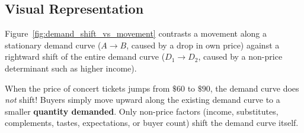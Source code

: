 \documentclass[11pt,letterpaper]{article}
\begin{document}
\subsection*{Visual Representation}
Figure~\ref{fig:demand_shift_vs_movement} contrasts a movement along a stationary demand curve ($A \to B$, caused by a drop in own price) against a rightward shift of the entire demand curve ($D_1 \to D_2$, caused by a non-price determinant such as higher income).

\begin{tcolorbox}[colback=CourseAmber!12!white,colframe=CourseOrange,title=\textbf{Clear It Up: Never Say ``Price Rose, So Demand Fell''}]
When the price of concert tickets jumps from $\$60$ to $\$90$, the demand curve does \emph{not} shift! Buyers simply move upward along the existing demand curve to a smaller \textbf{quantity demanded}. Only non-price factors (income, substitutes, complements, tastes, expectations, or buyer count) shift the demand curve itself.
\end{tcolorbox}
\end{document}
